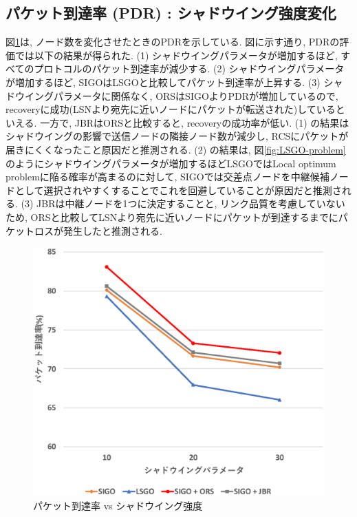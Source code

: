 \documentclass[10pt]{jreport}
\begin{document}
\subsection{パケット到達率 (PDR) : シャドウイング強度変化}
図\ref{fig:SIGO_PDR_shadow}は, ノード数を変化させたときのPDRを示している.
図に示す通り, PDRの評価では以下の結果が得られた.
(1) シャドウイングパラメータが増加するほど, すべてのプロトコルのパケット到達率が減少する.
(2) シャドウイングパラメータが増加するほど, SIGOはLSGOと比較してパケット到達率が上昇する.
(3) シャドウイングパラメータに関係なく, ORSはSIGOよりPDRが増加しているので, recoveryに成功(LSNより宛先に近いノードにパケットが転送された)しているといえる. 一方で, JBRはORSと比較すると, recoveryの成功率が低い.
(1) の結果はシャドウイングの影響で送信ノードの隣接ノード数が減少し, RCSにパケットが届きにくくなったこと原因だと推測される. 
(2) の結果は, 図\ref{fig:LSGO-problem}のようにシャドウイングパラメータが増加するほどLSGOではLocal optimum problemに陥る確率が高まるのに対して, SIGOでは交差点ノードを中継候補ノードとして選択されやすくすることでこれを回避していることが原因だと推測される. 
(3) JBRは中継ノードを1つに決定することと, リンク品質を考慮していないため, ORSと比較してLSNより宛先に近いノードにパケットが到達するまでにパケットロスが発生したと推測される. 


\begin{figure}[!ht]
	\centering
	\includegraphics[width=120mm]{figures/SIGO_PDR_shadow.eps}
	\caption{パケット到達率 vs シャドウイング強度}
	\label{fig:SIGO_PDR_shadow}
\end{figure}
\end{document}
